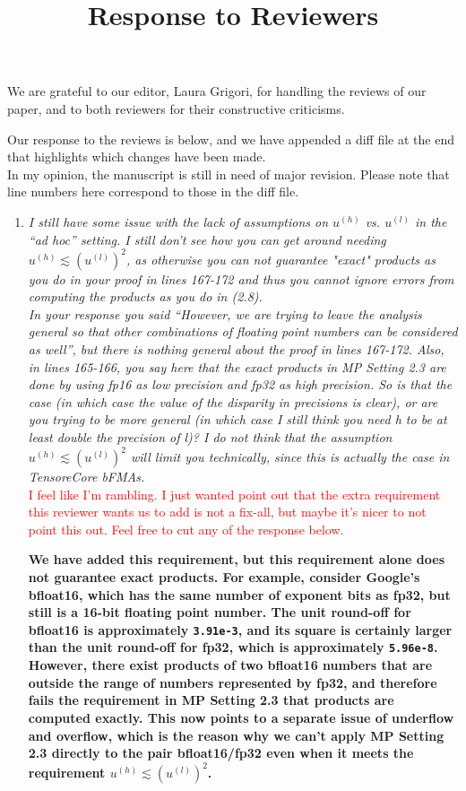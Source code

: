 \documentclass[final,onefignum,onetabnum]{siamart190516}
\newcommand{\red}[1]{\textcolor{red}{#1}}
\begin{document}
\title{Response to Reviewers}
\date{}
\maketitle
We are grateful to our editor, Laura Grigori, for handling the reviews of our paper, and to both reviewers for their constructive criticisms.

Our response to the reviews is below, and we have appended a diff file at the end that highlights which changes have been made.\\

In my opinion, the manuscript is still in need of major revision. 
Please note that line numbers here correspond to those in the diff file.
\begin{enumerate}
	\item {\it I still have some issue with the lack of assumptions on $u^{(h)}$ vs. $u^{(l)}$ in the ``ad hoc'' setting. I still don't see how you can get around needing $u^{(h)} \lesssim (u^{(l)})^2$, as otherwise you can not guarantee "exact" products as you do in your proof in lines 167-172 and thus you cannot ignore errors from computing the products as you do in (2.8). \\
	In your response you said ``However, we are trying to leave the analysis general so that other combinations of floating point numbers can be considered as well'', but there is nothing general about the proof in lines 167-172.  Also, in lines 165-166, you say here that the exact products in MP Setting 2.3 are done by using fp16 as low precision and fp32 as high precision. So is that the case (in which case the value of the disparity in precisions is clear), or are you trying to be more general (in which case I still think you need h to be at least double the precision of l)? I do not think that the assumption $u^{(h)} \lesssim (u^{(l)})^2$ will limit you technically, since this is actually the case in TensoreCore bFMAs.}\\
\red{I feel like I'm rambling. I just wanted point out that the extra requirement this reviewer wants us to add is not a fix-all, but maybe it's nicer to not point this out. Feel free to cut any of the response below.}\\
	{\bf We have added this requirement, but this requirement alone does not guarantee exact products.
		For example, consider Google's bfloat16, which has the same number of exponent bits as fp32, but still is a 16-bit floating point number. 
		The unit round-off for bfloat16 is approximately {\tt 3.91e-3}, and its square is certainly larger than the unit round-off for fp32, which is approximately {\tt 5.96e-8}. 
		However, there exist products of two bfloat16 numbers that are outside the range of numbers represented by fp32, and therefore fails the requirement in MP Setting 2.3 that products are computed exactly.
	    This now points to a separate issue of underflow and overflow, which is the reason why we can't apply MP Setting 2.3 directly to the pair bfloat16/fp32 even when it meets the requirement $u^{(h)} \lesssim (u^{(l)})^2$.  \par 
	    
}
\end{enumerate}
\end{document}
